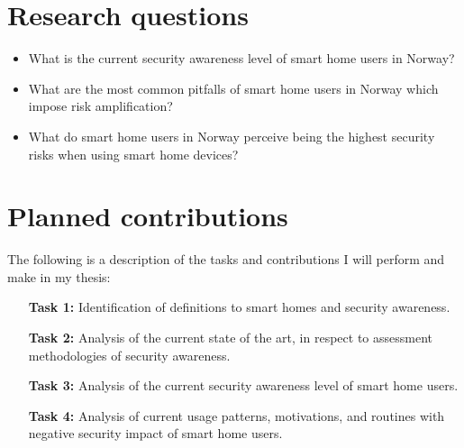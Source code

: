 \section{Research questions}\label{research:questions}
\begin{itemize}
    \item What is the current security awareness level of smart home users in Norway?
    \item What are the most common pitfalls of smart home users in Norway which impose risk amplification?
    \item What do smart home users in Norway perceive being the highest security risks when using smart home devices?
\end{itemize}

\section{Planned contributions}
The following is a description of the tasks and contributions I will perform and make in my thesis: 
\begin{itemize}
    \item[\textbf{Task 1:}] Identification of definitions to smart homes and security awareness. 
    \item[\textbf{Task 2:}] Analysis of the current state of the art, in respect to assessment methodologies of security awareness.
    \item[\textbf{Task 3:}] Analysis of the current security awareness level of smart home users.
    \item[\textbf{Task 4:}] Analysis of current usage patterns, motivations, and routines with negative security impact of smart home users.
\end{itemize}

\begin{comment}
Over the years, several thesis templates for \LaTeX{} have been developed by different groups at NTNU. Typically, there have been local templates for given study programmes, or different templates for the different study levels – bachelor, master, and PhD.\footnote{see, e.g., \url{https://github.com/COPCSE-NTNU/bachelor-thesis-NTNU} and \url{https://github.com/COPCSE-NTNU/master-theses-NTNU}}

Based on this experience, the Community of Practice in Computer Science Education at NTNU (CoPCSE$@$NTNU)\footnote{\url{https://www.ntnu.no/wiki/display/copcse/Community+of+Practice+in+Computer+Science+Education+Home}} is hereby offering a template that should in principle be applicable for theses at all study levels. It is closely based on the standard \LaTeX{} \texttt{report} document class as well as previous thesis templates. Since the central regulations for thesis design have been relaxed – at least for some of the historical university colleges now part of NTNU – the template has been simlified and put closer to the default \LaTeX{} look and feel.

The purpose of the present document is threefold. It should serve (i) as a description of the document class, (ii) as an example of how to use it, and (iii) as a thesis template.
\end{comment}